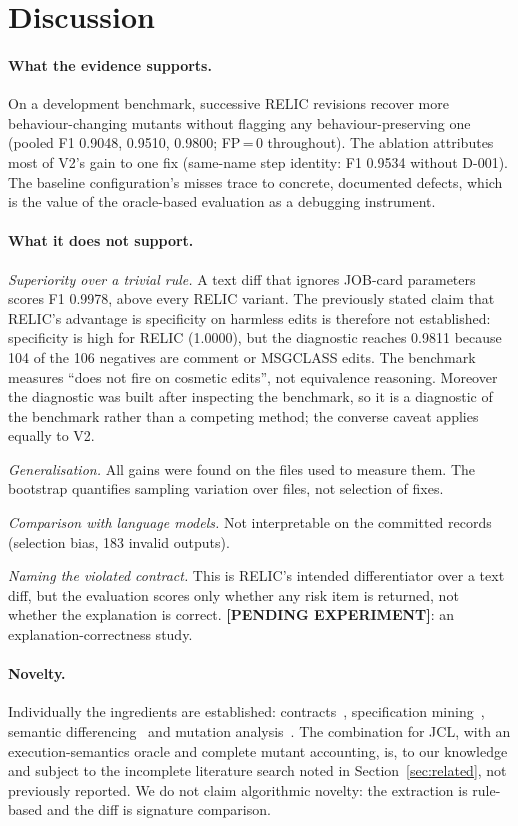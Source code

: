 \section{Discussion}
\label{sec:discussion}

\paragraph{What the evidence supports.}
On a development benchmark, successive RELIC revisions recover more
behaviour-changing mutants without flagging any behaviour-preserving one
(pooled F1 0.9048, 0.9510, 0.9800; FP\,=\,0 throughout). The ablation attributes
most of V2's gain to one fix (same-name step identity: F1 0.9534 without D-001).
The baseline configuration's misses trace to concrete, documented defects, which
is the value of the oracle-based evaluation as a debugging instrument.

\paragraph{What it does not support.}
\emph{Superiority over a trivial rule.} A text diff that ignores JOB-card
parameters scores F1 0.9978, above every RELIC variant. The previously stated
claim that RELIC's advantage is specificity on harmless edits is therefore not
established: specificity is high for RELIC (1.0000), but the diagnostic reaches
0.9811 because 104 of the 106 negatives are comment or MSGCLASS edits. The
benchmark measures ``does not fire on cosmetic edits'', not equivalence
reasoning. Moreover the diagnostic was built after inspecting the benchmark, so
it is a diagnostic of the benchmark rather than a competing method; the
converse caveat applies equally to V2.

\emph{Generalisation.} All gains were found on the files used to measure them.
The bootstrap quantifies sampling variation over files, not selection of fixes.

\emph{Comparison with language models.} Not interpretable on the committed
records (selection bias, 183 invalid outputs).

\emph{Naming the violated contract.} This is RELIC's intended differentiator
over a text diff, but the evaluation scores only whether any risk item is
returned, not whether the explanation is correct.
\textbf{[PENDING EXPERIMENT]}: an explanation-correctness study.

\paragraph{Novelty.}
Individually the ingredients are established: contracts~\cite{meyer1992applying},
specification mining~\cite{ernst2007daikon,ammons2002mining}, semantic
differencing~\cite{lahiri2012symdiff,jackson1994semantic} and mutation
analysis~\cite{jia2011mutation}. The combination for JCL, with an
execution-semantics oracle and complete mutant accounting, is, to our knowledge
and subject to the incomplete literature search noted in
Section~\ref{sec:related}, not previously reported. We do not claim algorithmic
novelty: the extraction is rule-based and the diff is signature comparison.

